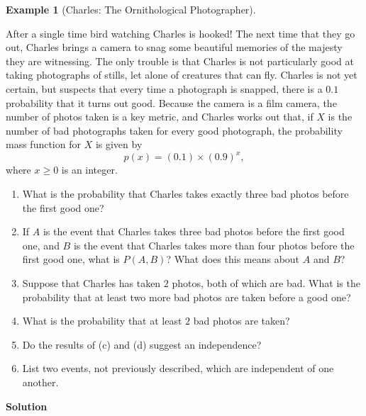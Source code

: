 \documentclass[
  letterpaper,
  DIV=11,
  numbers=noendperiod]{scrreprt}
\providecommand{\tightlist}{%
  \setlength{\itemsep}{0pt}\setlength{\parskip}{0pt}}\usepackage{longtable,booktabs,array}
\theoremstyle{definition}
\theoremstyle{definition}
\theoremstyle{definition}
\newtheorem{example}{Example}[chapter]
\theoremstyle{remark}
\begin{document}
\begin{example}[Charles: The Ornithological
Photographer]\protect\hypertarget{exm-condition-joint-probability}{}\label{exm-condition-joint-probability}

After a single time bird watching Charles is hooked! The next time that
they go out, Charles brings a camera to snag some beautiful memories of
the majesty they are witnessing. The only trouble is that Charles is not
particularly good at taking photographs of stills, let alone of
creatures that can fly. Charles is not yet certain, but suspects that
every time a photograph is snapped, there is a \(0.1\) probability that
it turns out good. Because the camera is a film camera, the number of
photos taken is a key metric, and Charles works out that, if \(X\) is
the number of bad photographs taken for every good photograph, the
probability mass function for \(X\) is given by
\[p(x) = (0.1)\times (0.9)^{x},\] where \(x \geq 0\) is an integer.

\begin{enumerate}
\def\labelenumi{\alph{enumi}.}
\tightlist
\item
  What is the probability that Charles takes exactly three bad photos
  before the first good one?
\item
  If \(A\) is the event that Charles takes three bad photos before the
  first good one, and \(B\) is the event that Charles takes more than
  four photos before the first good one, what is \(P(A,B)\)? What does
  this means about \(A\) and \(B\)?
\item
  Suppose that Charles has taken \(2\) photos, both of which are bad.
  What is the probability that at least two more bad photos are taken
  before a good one?
\item
  What is the probability that at least \(2\) bad photos are taken?
\item
  Do the results of (c) and (d) suggest an independence?
\item
  List two events, not previously described, which are independent of
  one another.
\end{enumerate}

\begin{tcolorbox}[enhanced jigsaw, colback=white, breakable, rightrule=.15mm, leftrule=.75mm, toprule=.15mm, left=2mm, arc=.35mm, opacityback=0, bottomrule=.15mm]

\vspace{-3mm}\textbf{Solution}\vspace{3mm}


\end{tcolorbox}
\end{example}
\end{document}
